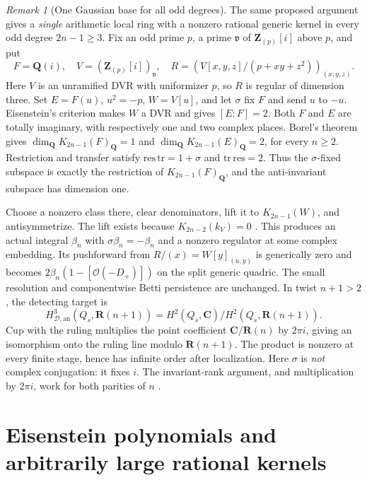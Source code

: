 \documentclass[11pt,a4paper]{article}
\theoremstyle{remark}
\newtheorem{remark}[theorem]{Remark}
\newcommand{\Q}{\mathbf Q}
\newcommand{\Z}{\mathbf Z}
\newcommand{\R}{\mathbf R}
\newcommand{\C}{\mathbf C}
\newcommand{\OO}{\mathcal O}
\newcommand{\HD}{H_{\mathcal D,\mathrm{an}}}
\begin{document}
\begin{remark}[One Gaussian base for all odd degrees]
\label{rem:fixedgaussianallodd}
The same proposed argument gives a \emph{single} arithmetic local
ring with a nonzero rational generic kernel in every odd degree
\(2n-1\ge3\). Fix an odd prime \(p\), a prime \(\mathfrak v\)
of \(\Z_{(p)}[i]\) above \(p\), and put
\[
 F=\Q(i),\quad V=(\Z_{(p)}[i])_{\mathfrak v},\quad
 R=\left(V[x,y,z]/(p+xy+z^2)\right)_{(x,y,z)}.
\]
Here \(V\) is an unramified DVR with uniformizer \(p\), so \(R\)
is regular of dimension three. Set \(E=F(u)\), \(u^2=-p\),
\(W=V[u]\), and let \(\sigma\) fix \(F\) and send \(u\) to \(-u\).
Eisenstein's criterion makes \(W\) a DVR and gives \([E:F]=2\).
Both \(F\) and \(E\) are totally imaginary, with respectively
one and two complex places. Borel's theorem gives
\(\dim_{\Q}K_{2n-1}(F)_{\Q}=1\) and
\(\dim_{\Q}K_{2n-1}(E)_{\Q}=2\), for every \(n\ge2\).
Restriction and transfer satisfy
\(\mathrm{res}\,\mathrm{tr}=1+\sigma\) and
\(\mathrm{tr}\,\mathrm{res}=2\).
Thus the \(\sigma\)-fixed subspace is exactly the restriction
of \(K_{2n-1}(F)_{\Q}\), and the anti-invariant subspace has
dimension one.

Choose a nonzero class there, clear denominators, lift it to
\(K_{2n-1}(W)\), and antisymmetrize. The lift exists because
\(K_{2n-2}(k_V)=0\)
\cite[Chapter~IV, Corollary~1.13]{Weibel}. This produces an actual integral
\(\beta_n\) with \(\sigma\beta_n=-\beta_n\) and a nonzero
regulator at some complex embedding. Its pushforward from
\(R/(x)=W[y]_{(u,y)}\) is generically zero and becomes
\(2\beta_n(1-[\OO(-D_+)])\) on the split generic quadric.
The small resolution and componentwise Betti persistence are
unchanged. In twist \(n+1>2\), the detecting target is
\[
 \HD^3(Q_s,\R(n+1))
   =H^2(Q_s,\C)/H^2(Q_s,\R(n+1)).
\]
Cup with the ruling multiplies the point coefficient
\(\C/\R(n)\) by \(2\pi i\), giving an isomorphism onto the
ruling line modulo \(\R(n+1)\). The product is nonzero at
every finite stage, hence has infinite order after localization.
Here \(\sigma\) is \emph{not} complex conjugation: it fixes \(i\).
The invariant-rank argument, and multiplication by \(2\pi i\),
work for both parities of \(n\) \cite{Borel,BunkeTamme,Quillen}.
\end{remark}


\section{Eisenstein polynomials and arbitrarily large rational kernels}\label{sec:eisenstein}
\end{document}
